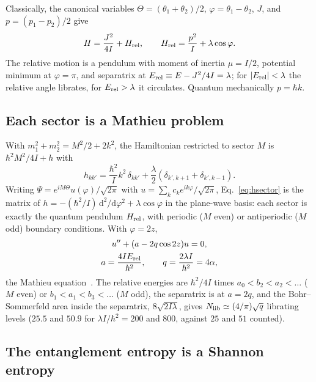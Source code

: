 \documentclass[pra,twocolumn,superscriptaddress,longbibliography,floatfix]{revtex4-2}
\newcommand{\dd}{\mathrm{d}}
\newcommand{\Erel}{E_{\rm rel}}
\begin{document}
Classically, the canonical variables $\Theta=(\theta_{1}+\theta_{2})/2$,
$\varphi=\theta_{1}-\theta_{2}$, $J$, and $p=(p_{1}-p_{2})/2$ give
\begin{equation}
H=\frac{J^{2}}{4I}+H_{\rm rel},\qquad
H_{\rm rel}=\frac{p^{2}}{I}+\lambda\cos\varphi .
\label{eq:Hcm}
\end{equation}
The relative motion is a pendulum with moment of inertia $\mu=I/2$, potential
minimum at $\varphi=\pi$, and separatrix at $\Erel\equiv E-J^{2}/4I=\lambda$; for
$|\Erel|<\lambda$ the relative angle librates, for $\Erel>\lambda$ it circulates.
Quantum mechanically $p=\hbar k$.

\subsection{Each sector is a Mathieu problem}

With $m_{1}^{2}+m_{2}^{2}=M^{2}/2+2k^{2}$, the Hamiltonian restricted to sector
$M$ is $\hbar^{2}M^{2}/4I+h$ with
\begin{equation}
h_{kk'}=\frac{\hbar^{2}}{I}k^{2}\,\delta_{kk'}
+\frac{\lambda}{2}\left(\delta_{k',k+1}+\delta_{k',k-1}\right).
\label{eq:hsector}
\end{equation}
Writing $\Psi=e^{iM\Theta}u(\varphi)/\sqrt{2\pi}$ with
$u=\sum_{k}c_{k}e^{ik\varphi}/\sqrt{2\pi}$, Eq.~\eqref{eq:hsector} is the matrix
of $h=-(\hbar^{2}/I)\,\dd^{2}/\dd\varphi^{2}+\lambda\cos\varphi$ in the plane-wave
basis: each sector is exactly the quantum pendulum $H_{\rm rel}$, with periodic
($M$ even) or antiperiodic ($M$ odd) boundary conditions. With $\varphi=2z$,
\begin{equation}
\begin{gathered}
u''+(a-2q\cos2z)u=0,\\
a=\frac{4I\Erel}{\hbar^{2}},\qquad q=\frac{2\lambda I}{\hbar^{2}}=4\alpha,
\end{gathered}
\label{eq:mathieu}
\end{equation}
the Mathieu equation~\cite{DLMF28}. The relative energies are
$\hbar^{2}/4I$ times $a_{0}<b_{2}<a_{2}<\dots$ ($M$ even) or
$b_{1}<a_{1}<b_{3}<\dots$ ($M$ odd), the separatrix is at $a=2q$, and the
Bohr--Sommerfeld area inside the separatrix, $8\sqrt{2I\lambda}$, gives
$N_{\rm lib}\simeq(4/\pi)\sqrt{q}$ librating levels ($25.5$ and $50.9$ for
$\lambda I/\hbar^{2}=200$ and $800$, against $25$ and $51$ counted).

\subsection{The entanglement entropy is a Shannon entropy}
\label{sec:S}
\end{document}
